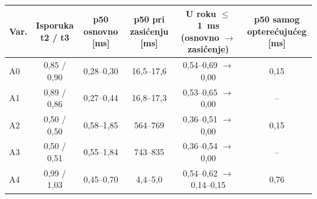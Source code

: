 \begin{tabular}{@{}lccccc@{}}
\toprule
Var. & \makecell{Isporuka\\t2 / t3} & \makecell{p50 osnovno\\{}[ms]} & \makecell{p50 pri zasićenju\\{}[ms]} & \makecell{U roku $\leq$1~ms\\(osnovno $\rightarrow$ zasićenje)} & \makecell{p50 samog\\opterećujućeg [ms]} \\
\midrule
A0 & 0{,}85 / 0{,}90 & 0{,}28--0{,}30 & 16{,}5--17{,}6 & 0{,}54--0{,}69 $\rightarrow$ 0{,}00 & 0{,}15 \\
A1 & 0{,}89 / 0{,}86 & 0{,}27--0{,}44 & 16{,}8--17{,}3 & 0{,}53--0{,}65 $\rightarrow$ 0{,}00 & -- \\
A2 & 0{,}50 / 0{,}50 & 0{,}58--1{,}85 & 564--769 & 0{,}36--0{,}51 $\rightarrow$ 0{,}00 & 0{,}15 \\
A3 & 0{,}50 / 0{,}51 & 0{,}55--1{,}84 & 743--835 & 0{,}36--0{,}54 $\rightarrow$ 0{,}00 & -- \\
A4 & 0{,}99 / 1{,}03 & 0{,}45--0{,}70 & 4{,}4--5{,}0 & 0{,}54--0{,}62 $\rightarrow$ 0{,}14--0{,}15 & 0{,}76 \\
\bottomrule
\end{tabular}
